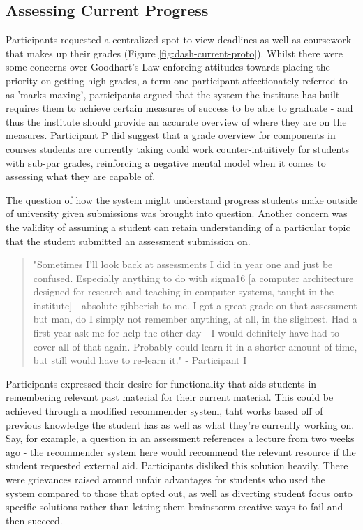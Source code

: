\documentclass{l4proj}
\begin{document}
\subsection{Assessing Current Progress}

Participants requested a centralized spot to view deadlines as well as coursework that makes up their grades (Figure \ref{fig:dash-current-proto}). Whilst there were some concerns over Goodhart's Law enforcing attitudes towards placing the priority on getting high grades, a term one participant affectionately referred to as 'marks-maxing', participants argued that the system the institute has built requires them to achieve certain measures of success to be able to graduate - and thus the institute should provide an accurate overview of where they are on the measures. Participant P did suggest that a grade overview for components in courses students are currently taking could work counter-intuitively for students with sub-par grades, reinforcing a negative mental model when it comes to assessing what they are capable of. 

The question of how the system might understand progress students make outside of university given submissions was brought into question. Another concern was the validity of assuming a student can retain understanding of a particular topic that the student submitted an assessment submission on. 

\begin{quote}
    "Sometimes I'll look back at assessments I did in year one and just be confused. Especially anything to do with sigma16 [a computer architecture designed for research and teaching in computer systems, taught in the institute] - absolute gibberish to me. I got a great grade on that assessment but man, do I simply not remember anything, at all, in the slightest. Had a first year ask me for help the other day - I would definitely have had to cover all of that again. Probably could learn it in a shorter amount of time, but still would have to re-learn it." - Participant I
\end{quote}

Participants expressed their desire for functionality that aids students in remembering relevant past material for their current material. This could be achieved through a modified recommender system, taht works based off of previous knowledge the student has as well as what they're currently working on. Say, for example, a question in an assessment references a lecture from two weeks ago - the recommender system here would recommend the relevant resource if the student requested external aid. Participants disliked this solution heavily. There were grievances raised around unfair advantages for students who used the system compared to those that opted out, as well as diverting student focus onto specific solutions rather than letting them brainstorm creative ways to fail and then succeed.
\end{document}
